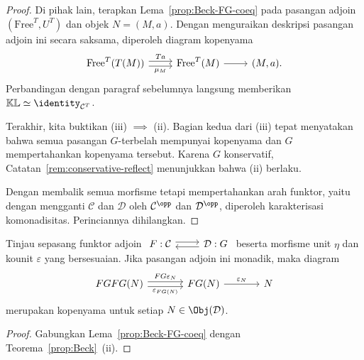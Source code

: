 \begin{proof}
	Di pihak lain, terapkan Lema~\ref{prop:Beck-FG-coeq} pada pasangan adjoin
	$(\mathrm{Free}^T,U^T)$ dan objek $N=(M,a)$. Dengan menguraikan deskripsi
	pasangan adjoin ini secara saksama, diperoleh diagram kopenyama
	\[\begin{tikzcd}[row sep=tiny]
		\mathrm{Free}^T(T(M)) \arrow[shift left, r, "Ta"] \arrow[shift right, r, "\mu_M"'] & \mathrm{Free}^T(M) \arrow[r] & (M, a).
	\end{tikzcd}\]
	Perbandingan dengan paragraf sebelumnya langsung memberikan
	$\mathbb{K}\mathbb{L}\simeq\identity_{\mathcal{C}^T}$.

	Terakhir, kita buktikan (iii) $\implies$ (ii). Bagian kedua dari (iii) tepat
	menyatakan bahwa semua pasangan $G$-terbelah mempunyai kopenyama dan $G$
	mempertahankan kopenyama tersebut. Karena $G$ konservatif,
	Catatan~\ref{rem:conservative-reflect} menunjukkan bahwa (ii) berlaku.

	Dengan membalik semua morfisme tetapi mempertahankan arah funktor, yaitu
	dengan mengganti $\mathcal{C}$ dan $\mathcal{D}$ oleh
	$\mathcal{C}^{\opp}$ dan $\mathcal{D}^{\opp}$, diperoleh karakterisasi
	komonadisitas. Perinciannya dihilangkan.
\end{proof}

\begin{corollary}
	Tinjau sepasang funktor adjoin
	$\begin{tikzcd}
		F: \mathcal{C} \arrow[shift left, r] & \mathcal{D}: G \arrow[shift left, l]
	\end{tikzcd}$
	beserta morfisme unit $\eta$ dan kounit $\varepsilon$ yang bersesuaian.
	Jika pasangan adjoin ini monadik, maka diagram
	\[\begin{tikzcd}[column sep=large]
		FGFG(N) \arrow[shift left, r, "FG\varepsilon_N"] \arrow[shift right, r, "\varepsilon_{FG(N)}"'] & FG(N) \arrow[r, "\varepsilon_N"] & N
	\end{tikzcd}\]
	merupakan kopenyama untuk setiap $N\in\Obj(\mathcal{D})$.
\end{corollary}
\begin{proof}
	Gabungkan Lema~\ref{prop:Beck-FG-coeq} dengan
	Teorema~\ref{prop:Beck}~(ii).
\end{proof}

